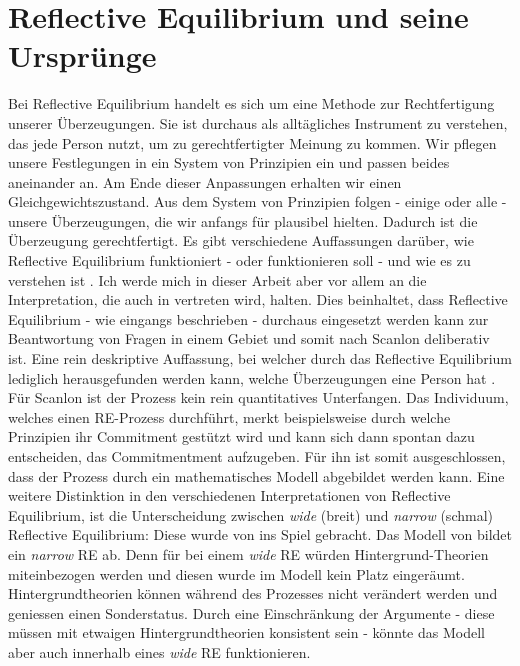 \documentclass{article}
\begin{document}
\section{Reflective Equilibrium und seine Ursprünge}

Bei Reflective Equilibrium handelt es sich um eine Methode zur Rechtfertigung unserer Überzeugungen. Sie ist durchaus als alltägliches Instrument zu verstehen, das jede Person nutzt, um zu gerechtfertigter Meinung zu kommen. Wir pflegen unsere Festlegungen in ein System von Prinzipien ein und passen beides aneinander an. Am Ende dieser Anpassungen erhalten wir einen Gleichgewichtszustand. Aus dem System von Prinzipien folgen - einige oder alle - unsere Überzeugungen, die wir anfangs für plausibel hielten. Dadurch ist die Überzeugung gerechtfertigt. Es gibt verschiedene Auffassungen darüber, wie Reflective Equilibrium funktioniert - oder funktionieren soll - und wie es zu verstehen ist \autocite{sep-reflective-equilibrium}.
Ich werde mich in dieser Arbeit aber vor allem an die Interpretation, die auch in \cite{beisbart_making_2015} vertreten wird, halten. Dies beinhaltet, dass Reflective Equilibrium - wie eingangs beschrieben - durchaus eingesetzt werden kann zur Beantwortung von Fragen in einem Gebiet und somit nach Scanlon deliberativ ist. Eine rein deskriptive Auffassung, bei welcher durch das Reflective Equilibrium lediglich herausgefunden werden kann, welche Überzeugungen eine Person hat \autocite[S.~143]{freeman_rawls_2002}. Für Scanlon ist der Prozess kein rein quantitatives Unterfangen. Das Individuum, welches einen RE-Prozess durchführt, merkt beispielsweise durch welche Prinzipien ihr Commitment gestützt wird und kann sich dann spontan dazu entscheiden, das Commitmentment aufzugeben. Für ihn ist somit ausgeschlossen, dass der Prozess durch ein mathematisches Modell abgebildet werden kann. \autocite[S.~148]{freeman_rawls_2002}
Eine weitere Distinktion in den verschiedenen Interpretationen von Reflective Equilibrium, ist die Unterscheidung zwischen \textit{wide} (breit) und \textit{narrow} (schmal) Reflective Equilibrium: Diese wurde von \citeauthor{daniels_wide_1996} ins Spiel gebracht. Das Modell von \citeauthor{beisbart_making_2015} bildet ein \textit{narrow} RE ab. Denn für bei einem \textit{wide} RE würden Hintergrund-Theorien miteinbezogen werden und diesen wurde im Modell kein Platz eingeräumt. Hintergrundtheorien können während des Prozesses nicht verändert werden und geniessen einen Sonderstatus. Durch eine Einschränkung der Argumente - diese müssen mit etwaigen Hintergrundtheorien konsistent sein - könnte das Modell aber auch innerhalb eines \textit{wide} RE funktionieren. \autocite[S.~22]{beisbart_making_2015}
\end{document}

